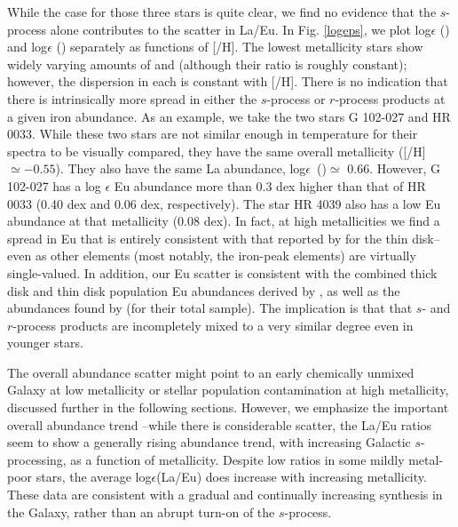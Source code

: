 \documentclass[12pt,preprint]{aastex}
\begin{document}
{While the case for those three stars is quite clear, we find no evidence that the $s$-process alone contributes to the scatter in La/Eu.  In Fig. \ref{logeps}, we plot log$\epsilon$ () and log$\epsilon$ () separately as functions of [/H].  The lowest metallicity stars show widely varying amounts of  and  (although their ratio is roughly constant);  however,  the dispersion in each is constant with [/H].  There is no indication that there is intrinsically more spread in either the $s$-process or $r$-process products at a given iron abundance.  As an example, we take the two stars G 102-027 and HR 0033.  While these two stars are not similar enough in temperature for their spectra to be visually compared, they have the same overall metallicity ([/H]$\simeq -0.55$).  They also have the same La abundance, log$\epsilon$~()$\simeq$ 0.66.  However, G 102-027 has a log $\epsilon$ Eu abundance more than 0.3 dex higher than that of HR 0033 (0.40 dex and 0.06 dex, respectively).  The star HR 4039 also has a low Eu abundance at that metallicity (0.08 dex).  In fact, at high metallicities we find a spread in Eu that is entirely consistent with that reported by \citet{Reddy2003} for the thin disk--even as other  elements (most notably, the iron-peak elements) are virtually single-valued.  In addition, our Eu scatter is consistent with the combined thick disk and thin disk population  Eu abundances derived by \citet{Mashonkina2001}, as well as the abundances found by \citet{Woolf1995} (for their total sample).  The implication is that that $s$- and $r$-process products are incompletely mixed to a very similar degree even in younger stars.

The overall abundance scatter might point to an early chemically unmixed Galaxy at low metallicity or stellar population contamination  at high metallicity, discussed further in the following sections.  However, we emphasize the important overall abundance trend  --while there is considerable scatter,  the La/Eu ratios seem to show a generally  rising abundance trend,  with increasing Galactic $s$-processing, as a function of metallicity.   Despite low ratios in some mildly metal-poor stars, the average log$\epsilon$(La/Eu) does increase with increasing metallicity.   These data are consistent with a  gradual and continually increasing  synthesis in the Galaxy,  rather than an abrupt turn-on of the $s$-process. 


}
\end{document}
